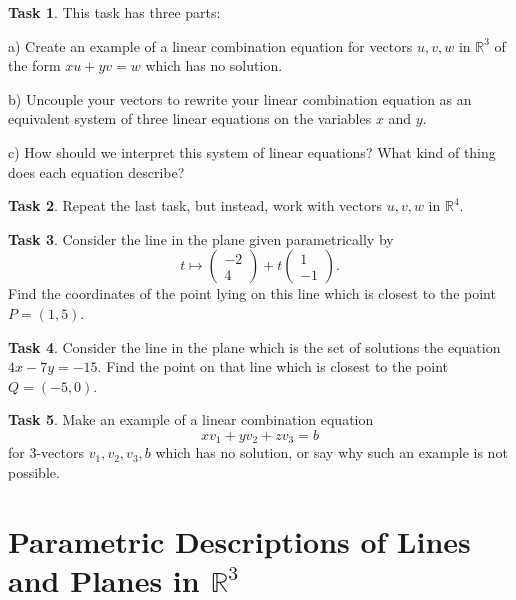 \documentclass{tufte-book}
\theoremstyle{definition}
\newtheorem{task}{Task}
\begin{document}
\begin{task} This task has three parts:
\begin{compactitem}
\item[a)] Create an example of a linear combination equation for vectors $u, v, w$ in $\mathbb{R}^3$ of the form $x u + y v = w$ which has no solution.
\item[b)] Uncouple your vectors to rewrite your linear combination equation as an equivalent system of three linear equations on the variables $x$ and $y$.
\item[c)] How should we interpret this system of linear equations? What kind of thing does each equation describe?
\end{compactitem}
\end{task}


\begin{task}
Repeat the last task, but instead, work with vectors $u, v, w$ in $\mathbb{R}^4$.
\end{task}


\begin{task}
Consider the line in the plane given parametrically by 
\[
t \mapsto \begin{pmatrix} -2 \\ 4 \end{pmatrix} + t \begin{pmatrix} 1 \\ -1\end{pmatrix}.
\]
Find the coordinates of the point lying on this line which is closest to the point $P = (1,5)$.
\end{task}


\begin{task}
Consider the line in the plane which is the set of solutions the equation $4x-7y=-15$. Find the point on that line which is closest to the point $Q=(-5,0)$.
\end{task}

\begin{task}
Make an example of a linear combination equation 
\[
xv_1 + y v_2 + z v_3 = b
\]
for $3$-vectors $v_1, v_2, v_3, b$ which has no solution, or say why such an example is not possible.
\end{task}

\section*{Parametric Descriptions of Lines and Planes in $\mathbb{R}^3$}
\end{document}
